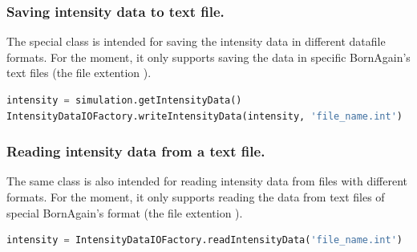 \subsubsection{Saving intensity data to text file.}

The special class  is intended for saving the intensity data
in different datafile formats. For the moment, it only supports saving the data in specific BornAgain's text files (the file extention ).

\begin{lstlisting}[language=python, style=eclipseboxed]
intensity = simulation.getIntensityData()
IntensityDataIOFactory.writeIntensityData(intensity, 'file_name.int')
\end{lstlisting}

\subsubsection{Reading intensity data from a text file.}
The same class is also intended for reading intensity data
from files with different formats. For the moment, it only supports reading the data from text files of special BornAgain's format (the file extention ).
 
\begin{lstlisting}[language=python, style=eclipseboxed]
intensity = IntensityDataIOFactory.readIntensityData('file_name.int')
\end{lstlisting}
